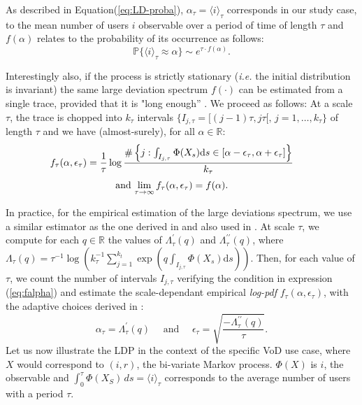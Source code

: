 \documentclass[twoside]{article}
\newcommand{\R}{\mathbb{R}}
\newcommand{\ud}{\textrm{d}}
\begin{document}
As described in Equation(\ref{eq:LD-proba}), $\alpha_{\tau}=\langle i \rangle_{\tau}$  corresponds in our study case, to the mean number of users $i$ observable over a period of time of length $\tau$ and $f(\alpha)$ relates to the probability of its occurrence as follows:
\begin{equation}
\mathbb{P} \{\langle i \rangle_{\tau} \approx \alpha \} \sim e^{\tau \cdot f(\alpha)}.
\label{eq:joint-prob}
\end{equation}

Interestingly also, if the process is strictly stationary (\emph{i.e.} the initial distribution is invariant) the same large deviation spectrum $f(\cdot)$ can be estimated from a single trace, provided that it is "long enough'' \cite{Barral11a}. We proceed as follows: At a scale $\tau$, the trace is chopped into $k_{\tau}$ intervals $\{I_{j,\tau}=[(j-1)\tau, j\tau[,\,j=1,\ldots,k_{\tau}\}$ of length $\tau$ and we have (almost-surely), for all $\alpha\in\R$:
\begin{equation}
\hspace*{-7mm}
\begin{array}{c}
\displaystyle{f_{\tau}(\alpha, \epsilon_{\tau}) = \frac{1}{\tau} \log \frac{ \#\left\{ j:   \int_{I_{j,\tau}} \Phi(X_s) \ud s \in [\alpha - \epsilon_{\tau}, \alpha+\epsilon_{\tau}]  \right\} }{k_{\tau}} } \\[4mm]
 \mbox{and }\displaystyle{ \lim_{\tau\to\infty} f_{\tau}(\alpha, \epsilon_{\tau}) =  f(\alpha).}
 \end{array}
\label{eq:falpha}
\end{equation}



In practice, for the empirical estimation of the large deviations spectrum, we use a similar  estimator as the one derived in \cite{Barral11b} and also used in \cite{Loiseau10a}.  At scale $\tau$, we compute for each $q\in \R$ the values of $\Lambda_{\tau}^{\prime} (q)$ and $\Lambda_{\tau}^{\prime\prime} (q)$, where 
{$\Lambda_{\tau} (q) = \tau^{-1} \log \left(k_{\tau}^{-1}\sum_{j=1}^{k_t} \exp \left( q \int_{I_{j,\tau}}  \Phi(X_s) \ud s  \right)\right)$}. Then, for each value of $\tau$, we count the number of intervals $I_{j, \tau}$ verifying the condition in expression (\ref{eq:falpha}) and estimate the scale-dependant empirical {\em log-pdf} $f_{\tau}(\alpha, \epsilon_{\tau})$, with the  adaptive choices derived in \cite{Barral11b}:
\begin{equation}
\alpha_{\tau}  = \Lambda_{\tau}^{\prime} (q) \quad \textrm{ and }  \quad \epsilon_{\tau} = \sqrt{ \frac{-\Lambda_{\tau}^{\prime\prime} (q)}{\tau} }.
\label{eq:alpha}
\end{equation}
Let us now illustrate the LDP in the context of the specific VoD use case, where $X$ would correspond to $(i, r)$, the bi-variate Markov process. $\Phi(X)$ is $i$, the observable and
$\int^\tau_0 \Phi(X_{S})\,ds = \langle i \rangle_{\tau}$ corresponds to the average number of users with a period $\tau$.
\end{document}
